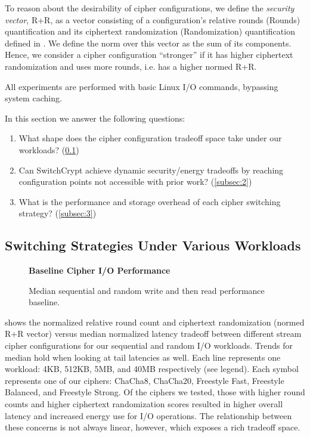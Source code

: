 To reason about the desirability of cipher configurations, we define the
\emph{security vector}, R+R, as a vector consisting of a configuration's
relative rounds (Rounds) quantification and its ciphertext randomization
(Randomization) quantification defined in . We define the norm
over this vector as the sum of its components. Hence, we consider a cipher
configuration ``stronger'' if it has higher ciphertext randomization and uses
more rounds, i.e. has a higher normed R+R.

All experiments are performed with basic Linux I/O commands, bypassing system
caching.

In this section we answer the following questions:

\begin{enumerate}
 \item What shape does the cipher configuration tradeoff space take under our
 workloads? (\cref{subsec:1})
 \item Can SwitchCrypt achieve dynamic security/energy tradeoffs by reaching
 configuration points not accessible with prior work? (\cref{subsec:2})
 \item What is the performance and storage overhead of each cipher switching
 strategy? (\cref{subsec:3})
\end{enumerate}

\subsection{Switching Strategies Under Various Workloads} \label{subsec:1}

\begin{figure}[ht]
  \textbf{Baseline Cipher I/O Performance}\par\medskip
  {} \caption{Median sequential and random
  write and then read performance baseline.}
 \label{fig:tradeoff-no-ratios}
\end{figure}

 shows the normalized relative round count and
ciphertext randomization (normed R+R vector) versus median normalized latency
tradeoff between different stream cipher configurations for our sequential and
random I/O workloads. Trends for median hold when looking at tail latencies as
well. Each line represents one workload: 4KB, 512KB, 5MB, and 40MB respectively
(see legend). Each symbol represents one of our ciphers: ChaCha8, ChaCha20,
Freestyle Fast, Freestyle Balanced, and Freestyle Strong. Of the ciphers we
tested, those with higher round counts and higher ciphertext randomization
scores resulted in higher overall latency and increased energy use for I/O
operations. The relationship between these concerns is not always linear,
however, which exposes a rich tradeoff space.

